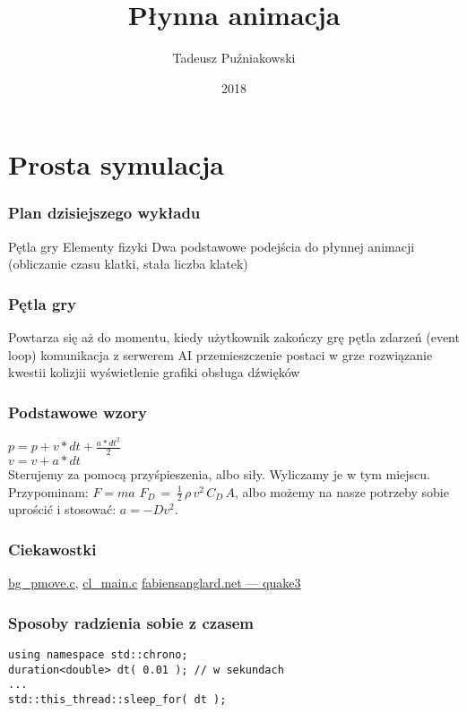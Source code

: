 \documentclass{beamer}
\title[SGD 1]{Płynna animacja}
\author{Tadeusz Puźniakowski}
\institute{PJATK}
\date{2018}
\begin{document}


\frame{\titlepage}

\section{Prosta symulacja}

\begin{frame}[fragile]
	\frametitle{Plan dzisiejszego wykładu}
	\BI
	\I Pętla gry
	\I Elementy fizyki
	\I Dwa podstawowe podejścia do płynnej animacji (obliczanie czasu klatki, stała liczba klatek)
	\EI
	\EB
\end{frame}

\begin{frame}[fragile]
	\frametitle{Pętla gry}
	Powtarza się aż do momentu, kiedy użytkownik zakończy grę
	\BI
	\I pętla zdarzeń (event loop)
	\I komunikacja z serwerem
	\I AI
	\I przemieszczenie postaci w grze
	\I rozwiązanie kwestii kolizjii
	\I wyświetlenie grafiki
	\I obsługa dźwięków
	\EI
	\EB
\end{frame}


\begin{frame}[fragile]
	\frametitle{Podstawowe wzory}
        $p = p + v * dt + \frac{a * dt^2}{2}$ \\
	$v = v + a * dt$ \\
	Sterujemy za pomocą przyśpieszenia, albo siły.
        Wyliczamy je w tym miejscu. Przypominam: $F=ma$
	\EB
	$F_{D}\,=\,{\tfrac {1}{2}}\,\rho \,v^{2}\,C_{D}\,A$, albo możemy na
nasze potrzeby sobie uprościć i stosować:
	$a = -Dv^2$.
	\EB
\end{frame}


\begin{frame}[fragile]
	\frametitle{Ciekawostki}
\BI	
\I \href{https://github.com/id-Software/Quake-III-Arena/blob/master/code/game/bg\_pmove.c}{bg\_pmove.c}, \href{https://github.com/raspberrypi/quake3/blob/master/code/client/cl\_main.c}{cl\_main.c}
\I \href{http://fabiensanglard.net/quake3/}{fabiensanglard.net --- quake3}
\EI
	\EB
\end{frame}


\begin{frame}[fragile]
	\frametitle{Sposoby radzienia sobie z czasem}
\begin{verbatim}
using namespace std::chrono;
duration<double> dt( 0.01 ); // w sekundach
...
std::this_thread::sleep_for( dt );
\end{verbatim}
	\EB
\end{frame}
\end{document}

